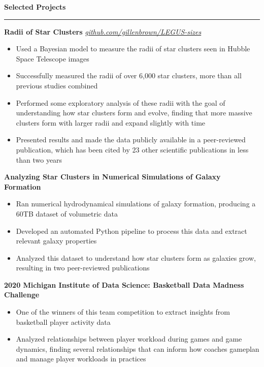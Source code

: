 \documentclass[10pt]{article}
\newcommand{\header}[1]{\vspace{0.7em}\par \textbf{\large #1}\strut\hrule\vspace{-0.6em}}
\newcommand{\actionHeader}[2]{\vspace{0.3em}\textbf{#1} \hfill #2}
\newcommand{\actionHeaderSecondLine}[2]{\newline \textit{#1} \hfill #2}
\begin{document}
\header{Selected Projects}

\actionHeader{Radii of Star Clusters}{}
\actionHeaderSecondLine{\href{https://github.com/gillenbrown/LEGUS-sizes}{github.com/gillenbrown/LEGUS-sizes}}{}
\begin{itemize}
    \item Used a Bayesian model to measure the radii of star clusters seen in Hubble Space Telescope images
    \item Successfully measured the radii of over 6,000 star clusters, more than all previous studies combined
    \item Performed some exploratory analysis of these radii with the goal of understanding how star clusters form and evolve, finding that more massive clusters form with larger radii and expand slightly with time
    \item Presented results and made the data publicly available in a peer-reviewed publication, which has been cited by 23 other scientific publications in less than two years 
\end{itemize}

\actionHeader{Analyzing Star Clusters in Numerical Simulations of Galaxy Formation}{}
\begin{itemize}
    \item Ran numerical hydrodynamical simulations of galaxy formation, producing a 60TB dataset of volumetric data
    \item Developed an automated Python pipeline to process this data and extract relevant galaxy properties
    \item Analyzed this dataset to understand how star clusters form as galaxies grow, resulting in two peer-reviewed publications
\end{itemize}

\actionHeader{2020 Michigan Institute of Data Science: Basketball Data Madness Challenge}{}
\begin{itemize}
    \item One of the winners of this team competition to extract insights from basketball player activity data
    \item Analyzed relationships between player workload during games and game dynamics, finding several relationships that can inform how coaches gameplan and manage player workloads in practices
\end{itemize}

\end{document}
